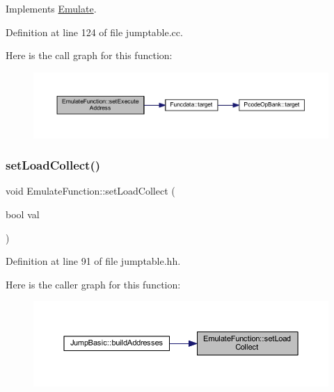 Implements \mbox{\hyperlink{class_emulate_aff5f9779fdad54f853d4e799f5289410}{Emulate}}.



Definition at line 124 of file jumptable.\+cc.

Here is the call graph for this function\+:
\nopagebreak
\begin{figure}[H]
\begin{center}
\leavevmode
\includegraphics[width=350pt]{class_emulate_function_abdda883c4bab425f1c060fcc6c867b25_cgraph}
\end{center}
\end{figure}
\mbox{\label{class_emulate_function_a4864478645ced2cdee8cf59547be7fa7}} 
\subsubsection{\texorpdfstring{setLoadCollect()}{setLoadCollect()}}
{\footnotesize\ttfamily void Emulate\+Function\+::set\+Load\+Collect (\begin{DoxyParamCaption}\item[{bool}]{val }\end{DoxyParamCaption})\hspace{0.3cm}{\ttfamily [inline]}}



Definition at line 91 of file jumptable.\+hh.

Here is the caller graph for this function\+:
\nopagebreak
\begin{figure}[H]
\begin{center}
\leavevmode
\includegraphics[width=350pt]{class_emulate_function_a4864478645ced2cdee8cf59547be7fa7_icgraph}
\end{center}
\end{figure}
\mbox{\label{class_emulate_function_a9b130aee822f3e00552259a3ecaf14ff}} 
